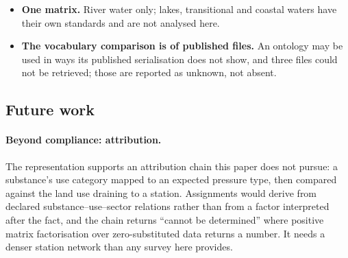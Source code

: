 \begin{itemize}
    limit against the standard, and Article~5(2) of Directive 2009/90/EC makes a
    mean below the limit a ``less than limit of quantification'' result rather
    than a value with an interval; the band is a metrological rule, applied where
    the record carries a measured value. The consequence is real and is kept
    visible rather than argued away: a limit of $0.9\,T$ yields
    \texttt{Compliant} where a measured $0.9\,T$ would yield
    \texttt{PossibleExceedance}. Every censored result whose limit lies within
    the band therefore carries the flag \texttt{LimitWithinUncertaintyBand}
    without changing its verdict --- \num{42594} of them --- and the rule is a
    parameter of the regulation package, so a jurisdiction that prefers the
    precautionary comparison can state it. The alternative is reported rather
    than buried, because it would have raised our own headline.
  \item \textbf{One matrix.} River water only; lakes, transitional and coastal
    waters have their own standards and are not analysed here.
  \item \textbf{The vocabulary comparison is of published files.} An ontology
    may be used in ways its published serialisation does not show, and three
    files could not be retrieved; those are reported as unknown, not absent.
\end{itemize}

\subsection{Future work}
\label{sec:discussion-future}

\paragraph{Beyond compliance: attribution.}
The representation supports an attribution chain this paper does not pursue: a
substance's use category mapped to an expected pressure type, then compared
against the land use draining to a station. Assignments would derive from declared
substance--use--sector relations rather than from a factor interpreted after
the fact, and the chain returns ``cannot be determined'' where positive matrix
factorisation over zero-substituted data returns a number. It needs a denser
station network than any survey here provides.

